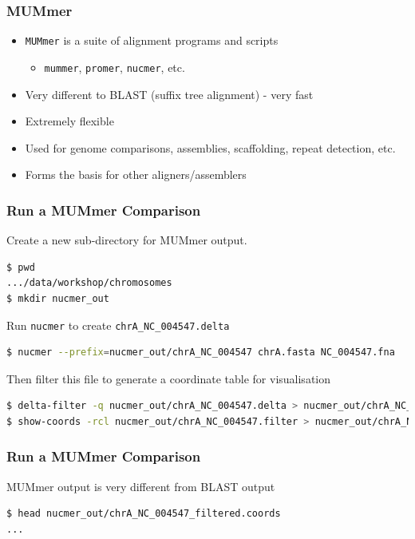 \documentclass[table]{beamer}
\begin{document}
  \begin{frame}
    \frametitle{MUMmer}
    \begin{itemize}
      \item \texttt{MUMmer} is a suite of alignment programs and scripts
      \begin{itemize}
        \item \texttt{mummer}, \texttt{promer}, \texttt{nucmer}, etc.
      \end{itemize}
      \item Very different to BLAST (suffix tree alignment) - very fast
      \item Extremely flexible
      \item Used for genome comparisons, assemblies, scaffolding, repeat detection, etc.
      \item Forms the basis for other aligners/assemblers
    \end{itemize}
\end{frame}

  \begin{frame}[fragile]
    \frametitle{Run a MUMmer Comparison}
    Create a new sub-directory for MUMmer output.
\begin{lstlisting}[language=bash]
$ pwd
.../data/workshop/chromosomes
$ mkdir nucmer_out
\end{lstlisting}
    Run \texttt{nucmer} to create \texttt{chrA\_NC\_004547.delta} \\
\begin{lstlisting}[language=bash]
$ nucmer --prefix=nucmer_out/chrA_NC_004547 chrA.fasta NC_004547.fna
\end{lstlisting}
    Then filter this file to generate a coordinate table for visualisation
\begin{lstlisting}[language=bash]
$ delta-filter -q nucmer_out/chrA_NC_004547.delta > nucmer_out/chrA_NC_004547.filter
$ show-coords -rcl nucmer_out/chrA_NC_004547.filter > nucmer_out/chrA_NC_004547_filtered.coords
\end{lstlisting}
\end{frame}

  \begin{frame}[fragile]
    \frametitle{Run a MUMmer Comparison}
    MUMmer output is very different from BLAST output
\begin{lstlisting}[language=bash]
$ head nucmer_out/chrA_NC_004547_filtered.coords
...
\end{lstlisting}
\end{frame}
\end{document}

